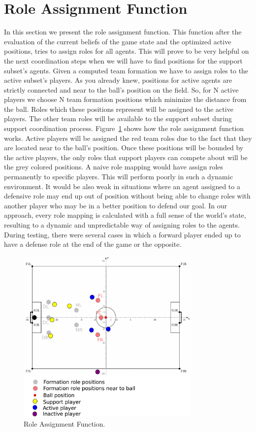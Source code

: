 \section{Role Assignment Function}
In this section we present the role assignment function. This function after the evaluation of the current beliefs of the game state and the optimized active positions, tries to assign roles for all agents. This will prove to be very helpful on the next coordination steps when we will have to find positions for the support subset's agents. Given a computed team formation we have to assign roles to the active subset's players. As you already knew, positions for active agents are strictly connected and near to the ball's position on the field. So, for N active players we choose N team formation positions which minimize the distance from the ball. Roles which these positions represent will be assigned to the active players. The other team roles will be available to the support subset during support coordination process. Figure~\ref{fig:RoleAss} shows how the role assignment function works. Active players will be assigned the red team roles due to the fact that they are located near to the ball's position. Once these positions will be bounded by the active players, the only roles that support players can compete about will be the grey colored positions. A naive role mapping would have assign roles permanently to specific players. This will perform poorly in such a dynamic environment. It would be also weak in situations where an agent assigned to a defensive role may end up out of position without being able to change roles with another player who may be in a better position to defend our goal. In our approach, every role mapping is calculated with a full sense of the world's state, resulting to a dynamic and unpredictable way of assigning roles to the agents. During testing, there were several cases in which a forward player ended up to have a defense role at the end of the game or the opposite.

\begin{figure}[t!]
\centering
  \includegraphics[width=0.8\textwidth]{Chapter4/figures/RoleAss.pdf}
  \caption{Role Assignment Function.} 
  \label{fig:RoleAss}
\end{figure}


